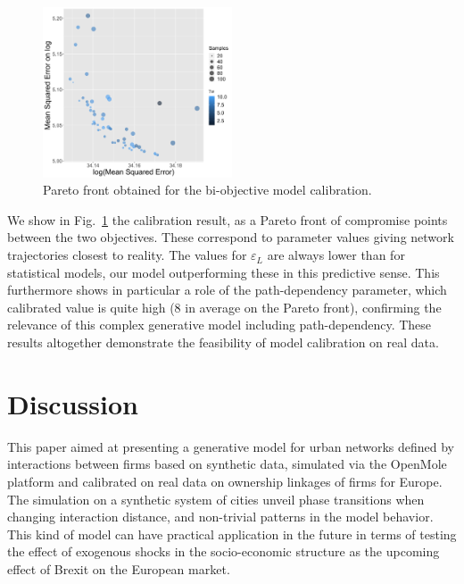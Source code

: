 \documentclass[11pt]{article}
\begin{document}
\begin{figure}
	\begin{center}
    \includegraphics[width=0.5\textwidth]{figures/pareto_colorgammaLinks.png}
    \end{center}
	\caption{Pareto front obtained for the bi-objective model calibration.\label{fig:calibration}}
\end{figure}


We show in Fig.~\ref{fig:calibration} the calibration result, as a Pareto front of compromise points between the two objectives. These correspond to parameter values giving network trajectories closest to reality. The values for $\varepsilon_L$ are always lower than for statistical models, our model outperforming these in this predictive sense.
This furthermore shows in particular a role of the path-dependency parameter, which calibrated value is quite high (8 in average on the Pareto front), confirming the relevance of this complex generative model including path-dependency. These results altogether demonstrate the feasibility of model calibration on real data.


\section{Discussion}

This paper aimed at presenting a generative model for urban networks defined by interactions between firms based on synthetic data, simulated via the OpenMole platform and calibrated on real data on ownership linkages of firms for Europe. The simulation on a synthetic system of cities unveil phase transitions when changing interaction distance, and non-trivial patterns in the model behavior. This kind of model can have practical application in the future in terms of testing the effect of exogenous shocks in the socio-economic structure as the upcoming effect of Brexit on the European market.
\end{document}
